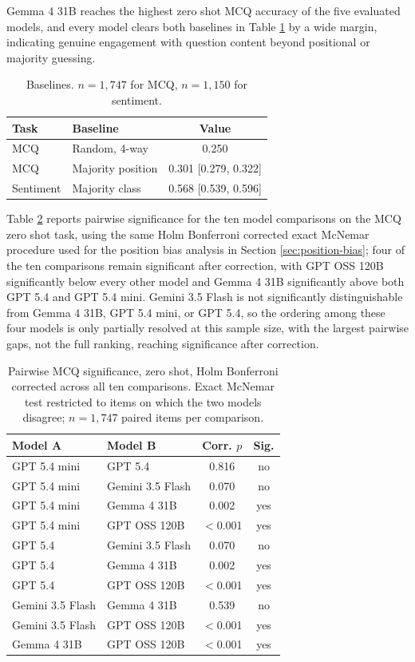 \documentclass[pdflatex,sn-mathphys-ay]{sn-jnl}
\begin{document}
Gemma 4 31B reaches the highest zero shot MCQ accuracy of the five evaluated models, and every model clears both baselines in Table \ref{tab:baselines} by a wide margin, indicating genuine engagement with question content beyond positional or majority guessing.

\begin{table}[t]
\centering
\small
\begin{tabular}{llc}
\toprule
\textbf{Task} & \textbf{Baseline} & \textbf{Value} \\
\midrule
MCQ & Random, 4-way & 0.250 \\
MCQ & Majority position & 0.301 [0.279, 0.322] \\
Sentiment & Majority class & 0.568 [0.539, 0.596] \\
\bottomrule
\end{tabular}
\caption{Baselines. $n{=}1{,}747$ for MCQ, $n{=}1{,}150$ for sentiment.}
\label{tab:baselines}
\end{table}

Table \ref{tab:pairwise} reports pairwise significance for the ten model comparisons on the MCQ zero shot task, using the same Holm Bonferroni corrected exact McNemar procedure used for the position bias analysis in Section \ref{sec:position-bias}; four of the ten comparisons remain significant after correction, with GPT OSS 120B significantly below every other model and Gemma 4 31B significantly above both GPT 5.4 and GPT 5.4 mini. Gemini 3.5 Flash is not significantly distinguishable from Gemma 4 31B, GPT 5.4 mini, or GPT 5.4, so the ordering among these four models is only partially resolved at this sample size, with the largest pairwise gaps, not the full ranking, reaching significance after correction.

\begin{table}[t]
\centering
\small
\begin{tabular}{llcc}
\toprule
\textbf{Model A} & \textbf{Model B} & \textbf{Corr. $p$} & \textbf{Sig.} \\
\midrule
GPT 5.4 mini & GPT 5.4 & 0.816 & no \\
GPT 5.4 mini & Gemini 3.5 Flash & 0.070 & no \\
GPT 5.4 mini & Gemma 4 31B & 0.002 & yes \\
GPT 5.4 mini & GPT OSS 120B & $<$0.001 & yes \\
GPT 5.4 & Gemini 3.5 Flash & 0.070 & no \\
GPT 5.4 & Gemma 4 31B & 0.002 & yes \\
GPT 5.4 & GPT OSS 120B & $<$0.001 & yes \\
Gemini 3.5 Flash & Gemma 4 31B & 0.539 & no \\
Gemini 3.5 Flash & GPT OSS 120B & $<$0.001 & yes \\
Gemma 4 31B & GPT OSS 120B & $<$0.001 & yes \\
\bottomrule
\end{tabular}
\caption{Pairwise MCQ significance, zero shot, Holm Bonferroni corrected across all ten comparisons. Exact McNemar test restricted to items on which the two models disagree; $n{=}1{,}747$ paired items per comparison.}
\label{tab:pairwise}
\end{table}
\end{document}
